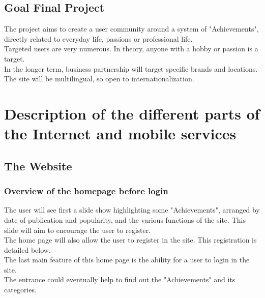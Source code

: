 \documentclass {life-en}
\begin{document}
\section{Goal Final Project}

The project aims to create a user community around a system of "Achievements", directly related to everyday life, passions or professional life.\\

Targeted users are very numerous. In theory, anyone with a hobby or passion is a target.\\

In the longer term, business partnership will target specific brands and locations.\\

The site will be multilingual, so open to internationalization.


\chapter{Description of the different parts of the Internet and mobile services}

\section{The Website}

\subsection{Overview of the homepage before login}

The user will see first a slide show highlighting some "Achievements", arranged by date of publication and popularity, and the various functions of the site. This slide will aim to encourage the user to register.\\

The home page will also allow the user to register in the site. This registration is detailed below.\\

The last main feature of this home page is the ability for a user to login in the site.\\

The entrance could eventually help to find out the "Achievements" and its categories.

\newpage
\end{document}
